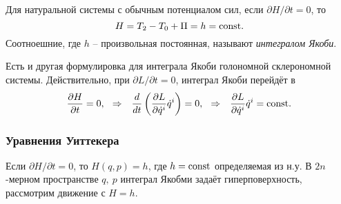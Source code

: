 \begin{to_def} 
    Для натуральной системы с обычным потенциалом сил, если $\partial H/ \partial t =0$, то
    \begin{equation*}
         H = T_2 - T_0 + \Pi = h = \text{const}.
     \end{equation*} 
     Соотноешние, где $h$ -- произвольная постоянная, называют \textit{интегралом Якоби}.
\end{to_def}

Есть и другая формулировка для интеграла Якоби голономной склерономной системы. Действительно, при $\partial L / \partial t = 0$, интеграл Якоби перейдёт в
\begin{equation*}
    \frac{\partial H}{\partial t} = 0,
    \hspace{0.25cm} \Rightarrow \hspace{0.25cm} 
    \frac{d }{d t} \left(
        \frac{\partial L}{\partial \dot{q}^i} \dot{q}^i
    \right) = 0,
    \hspace{0.25cm} \Rightarrow \hspace{0.25cm} 
    \frac{\partial L}{\partial \dot{q}^i} \dot{q}^i = \text{const}.
\end{equation*}



\subsubsection*{Уравнения Уиттекера}


Если $\partial H / \partial t = 0$, то $H(q, p) = h$, где $h = \text{const}$ определяемая из н.у. В $2n$-мерном пространстве $q, \ p$ интеграл Якобми задаёт гиперповерхность, рассмотрим движение с $H = h$.

